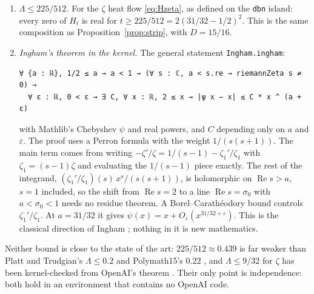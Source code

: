 \documentclass[11pt]{article}
\theoremstyle{definition}
\newcommand{\lean}[1]{\texttt{#1}}
\newcommand{\re}{\operatorname{Re}}
\newcommand{\Lc}{\Lambda}
\begin{document}
\begin{enumerate}
\item \emph{$\Lc \le 225/512$.} For the $\zeta$ heat flow \eqref{eq:Hzeta}, as defined on the \lean{dbn} island: every zero of $H_t$ is real for $t \ge 225/512 = 2(31/32 - 1/2)^2$. This is the same composition as Proposition~\ref{prop:strip}, with $D = 15/16$.
\item \emph{Ingham's theorem in the kernel.} The general statement \lean{Ingham.ingham}:
\begin{lstlisting}
∀ {a : ℝ}, 1/2 ≤ a → a < 1 → (∀ s : ℂ, a < s.re → riemannZeta s ≠ 0) →
  ∀ ε : ℝ, 0 < ε → ∃ C, ∀ x : ℝ, 2 ≤ x → |ψ x − x| ≤ C * x ^ (a + ε)
\end{lstlisting}
with Mathlib's Chebyshev $\psi$ and real powers, and $C$ depending only on $a$ and $\varepsilon$. The proof uses a Perron formula with the weight $1/(s(s+1))$. The main term comes from writing $-\zeta'/\zeta = 1/(s-1) - \zeta_1'/\zeta_1$ with $\zeta_1 = (s-1)\zeta$ and evaluating the $1/(s-1)$ piece exactly. The rest of the integrand, $(\zeta_1'/\zeta_1)(s)\,x^s/(s(s+1))$, is holomorphic on $\re s > a$, $s = 1$ included, so the shift from $\re s = 2$ to a line $\re s = \sigma_0$ with $a < \sigma_0 < 1$ needs no residue theorem. A Borel--Carath\'eodory bound controls $\zeta_1'/\zeta_1$. At $a = 31/32$ it gives $\psi(x) = x + O_\varepsilon(x^{31/32+\varepsilon})$. This is the classical direction of Ingham \cite{Ingham1932}; nothing in it is new mathematics.
\end{enumerate}

\noindent
Neither bound is close to the state of the art: $225/512 \approx 0.439$ is far weaker than Platt and Trudgian's $\Lc \le 0.2$ \cite{PlattTrudgian2021} and Polymath15's $0.22$ \cite{Polymath2019}, and $\Lc \le 9/32$ for $\zeta$ has been kernel-checked from OpenAI's theorem \cite{Murphy932}. Their only point is independence: both hold in an environment that contains no OpenAI code.
\end{document}
